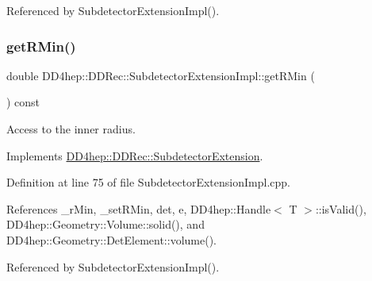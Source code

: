 Referenced by Subdetector\+Extension\+Impl().

\hypertarget{class_d_d4hep_1_1_d_d_rec_1_1_subdetector_extension_impl_ae7d7465cb600b068d0e2e9b2d80dd831}{}\label{class_d_d4hep_1_1_d_d_rec_1_1_subdetector_extension_impl_ae7d7465cb600b068d0e2e9b2d80dd831} 
\subsubsection{\texorpdfstring{get\+R\+Min()}{getRMin()}}
{\footnotesize\ttfamily double D\+D4hep\+::\+D\+D\+Rec\+::\+Subdetector\+Extension\+Impl\+::get\+R\+Min (\begin{DoxyParamCaption}{ }\end{DoxyParamCaption}) const\hspace{0.3cm}{\ttfamily [virtual]}}



Access to the inner radius. 



Implements \hyperlink{class_d_d4hep_1_1_d_d_rec_1_1_subdetector_extension_a2de40b96e752aee9d68559657c8b7874}{D\+D4hep\+::\+D\+D\+Rec\+::\+Subdetector\+Extension}.



Definition at line 75 of file Subdetector\+Extension\+Impl.\+cpp.



References \+\_\+r\+Min, \+\_\+set\+R\+Min, det, e, D\+D4hep\+::\+Handle$<$ T $>$\+::is\+Valid(), D\+D4hep\+::\+Geometry\+::\+Volume\+::solid(), and D\+D4hep\+::\+Geometry\+::\+Det\+Element\+::volume().



Referenced by Subdetector\+Extension\+Impl().

\hypertarget{class_d_d4hep_1_1_d_d_rec_1_1_subdetector_extension_impl_af83c23c0ccf18297c07bf3a55cc3b16c}{}\label{class_d_d4hep_1_1_d_d_rec_1_1_subdetector_extension_impl_af83c23c0ccf18297c07bf3a55cc3b16c} 
